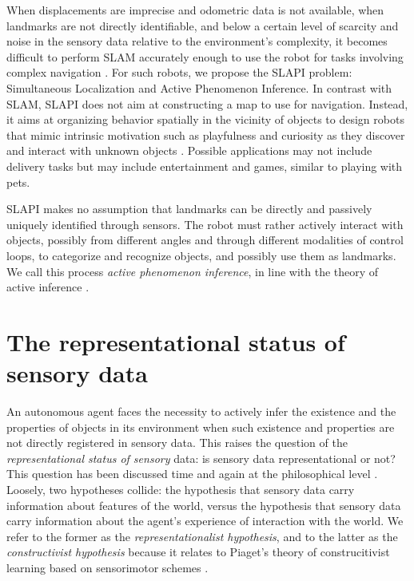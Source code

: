 \documentclass[pmlr]{jmlr}%
\begin{document}
When displacements are imprecise and odometric data is not available, when landmarks are not directly identifiable, and below a certain level of scarcity and noise in the sensory data relative to the environment’s complexity, it becomes difficult to perform SLAM accurately enough to use the robot for tasks involving complex navigation \citep{gay_towards_2021}. 
For such robots, we propose the SLAPI problem:  Simultaneous Localization and Active Phenomenon Inference.
In contrast with SLAM, SLAPI does not aim at constructing a map to use for navigation. 
Instead, it aims at organizing behavior spatially in the vicinity of objects to design robots that mimic intrinsic motivation such as playfulness and curiosity as they discover and interact with unknown objects \citep[e.g.,][]{oudeyer_intrinsic_2007}. 
Possible applications may not include delivery tasks but may include entertainment and games, similar to playing with pets. 

SLAPI makes no assumption that landmarks can be directly and passively uniquely identified through sensors. 
The robot must rather actively interact with objects, possibly from different angles and through different modalities of control loops, to categorize and recognize objects, and possibly use them as landmarks. 
We call this process \textit{active phenomenon inference}, in line with the theory of active inference \cite[e.g.,][]{friston_world_2021}. 


\section{The representational status of sensory data}
\label{sec:input}

An autonomous agent faces the necessity to actively infer the existence and the properties of objects in its environment when such existence and properties are not directly registered in sensory data. 
This raises the question of the \textit{representational status of sensory} data: is sensory data representational or not? 
This question has been discussed time and again at the philosophical level \citep[e.g.,][]{williford_husserls_2013}.
Loosely, two hypotheses collide: the hypothesis that sensory data carry information about features of the world, versus the hypothesis that sensory data carry information about the agent's experience of interaction with the world. 
We refer to the former as the \textit{representationalist hypothesis}, and to the latter as the \textit{constructivist hypothesis} because it relates to Piaget's theory of construcitivist learning based on sensorimotor schemes \citep{guillermin_artificial_2022}. 
\end{document}
